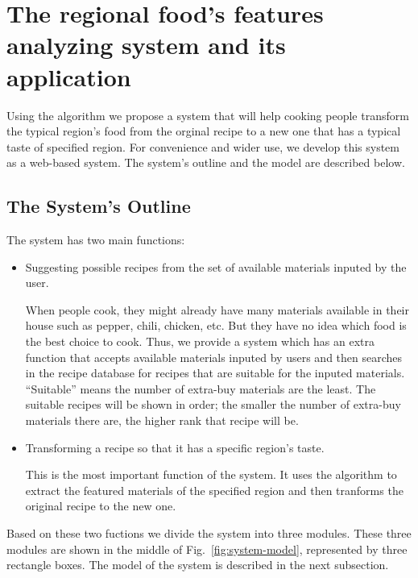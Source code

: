 \documentclass{sig-alternate}
\begin{document}
\section{The regional food's features analyzing system and its application}

Using the algorithm we propose a system that will help cooking people transform the typical region's food from the orginal recipe to a new one that has a typical taste of specified region. For convenience and wider use, we develop this system as a web-based system. The system's outline and the model are described below.  

\subsection{The System's Outline} 

The system has two main functions:

\begin{itemize}

\item Suggesting possible recipes from the set of available materials inputed by the user. 

When people cook, they might already have many materials available in their house such as pepper, chili, chicken, etc. But they have no idea which food is the best choice to cook. Thus, we provide a system which has an extra function that accepts available materials inputed by users and then searches in the recipe database for recipes that are suitable for the inputed materials. ``Suitable'' means the number of extra-buy materials are the least. The suitable recipes will be shown in order; the smaller the number of extra-buy materials there are, the higher rank that recipe will be.

\item Transforming a recipe so that it has a specific region's taste. 

This is the most important function of the system. It uses the algorithm to extract the featured materials of the specified region and then tranforms the original recipe to the new one. 
\end{itemize}

Based on these two fuctions we divide the system into three modules. These three modules are shown in the middle of Fig.~\ref{fig:system-model}, represented by three rectangle boxes. The model of the system is described in the next subsection.
 
\end{document}
